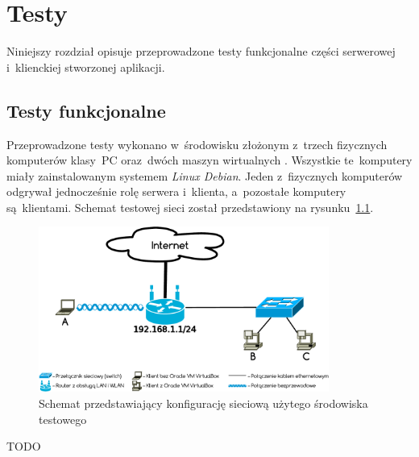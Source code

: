 \documentclass[thesis]{subfiles}
\begin{document}
\chapter{Testy}

Niniejszy rozdział opisuje przeprowadzone testy funkcjonalne części serwerowej i~klienckiej stworzonej aplikacji.

%
%
%

\section{Testy funkcjonalne}

Przeprowadzone testy wykonano w~środowisku złożonym z~trzech fizycznych komputerów klasy~PC oraz~dwóch maszyn wirtualnych . Wszystkie te~komputery miały zainstalowanym systemem \emph{Linux Debian}. Jeden z~fizycznych komputerów odgrywał jednocześnie rolę serwera i~klienta, a~pozostałe komputery są~klientami. Schemat testowej sieci został przedstawiony na rysunku~\ref{fig:testing-network}.

\begin{figure}
	\centering
	\includegraphics[width=0.85\textwidth]{img/testing-network}
	\caption{Schemat przedstawiający konfigurację sieciową użytego środowiska testowego}
	\label{fig:testing-network}
\end{figure}

TODO
\end{document}
